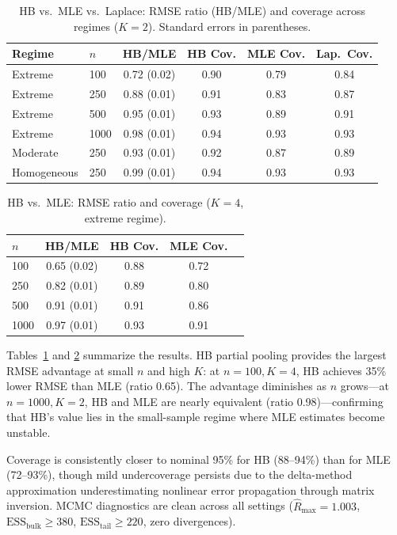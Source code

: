 \documentclass[11pt,a4paper]{article}
\begin{document}
\begin{table}[t]
\centering
\small
\caption{HB vs.\ MLE vs.\ Laplace: RMSE ratio (HB/MLE) and coverage across regimes ($K=2$). Standard errors in parentheses.}
\label{tab:hb_main}
\begin{tabular}{llcccc}
\toprule
Regime & $n$ & HB/MLE & HB Cov. & MLE Cov. & Lap.\ Cov. \\
\midrule
Extreme & 100 & 0.72 (0.02) & 0.90 & 0.79 & 0.84 \\
Extreme & 250 & 0.88 (0.01) & 0.91 & 0.83 & 0.87 \\
Extreme & 500 & 0.95 (0.01) & 0.93 & 0.89 & 0.91 \\
Extreme & 1000 & 0.98 (0.01) & 0.94 & 0.93 & 0.93 \\
Moderate & 250 & 0.93 (0.01) & 0.92 & 0.87 & 0.89 \\
Homogeneous & 250 & 0.99 (0.01) & 0.94 & 0.93 & 0.93 \\
\bottomrule
\end{tabular}
\end{table}

\begin{table}[t]
\centering
\small
\caption{HB vs.\ MLE: RMSE ratio and coverage ($K=4$, extreme regime).}
\label{tab:hb_k4}
\begin{tabular}{lcccc}
\toprule
$n$ & HB/MLE & HB Cov. & MLE Cov. \\
\midrule
100 & 0.65 (0.02) & 0.88 & 0.72 \\
250 & 0.82 (0.01) & 0.89 & 0.80 \\
500 & 0.91 (0.01) & 0.91 & 0.86 \\
1000 & 0.97 (0.01) & 0.93 & 0.91 \\
\bottomrule
\end{tabular}
\end{table}

Tables~\ref{tab:hb_main} and \ref{tab:hb_k4} summarize the results.
HB partial pooling provides the largest RMSE advantage at small $n$ and high $K$: at $n=100, K=4$, HB achieves 35\% lower RMSE than MLE (ratio 0.65).
The advantage diminishes as $n$ grows---at $n=1000, K=2$, HB and MLE are nearly equivalent (ratio 0.98)---confirming that HB's value lies in the small-sample regime where MLE estimates become unstable.

Coverage is consistently closer to nominal 95\% for HB (88--94\%) than for MLE (72--93\%), though mild undercoverage persists due to the delta-method approximation underestimating nonlinear error propagation through matrix inversion.
MCMC diagnostics are clean across all settings ($\hat{R}_{\max} = 1.003$, $\text{ESS}_{\text{bulk}} \geq 380$, $\text{ESS}_{\text{tail}} \geq 220$, zero divergences).
\end{document}
